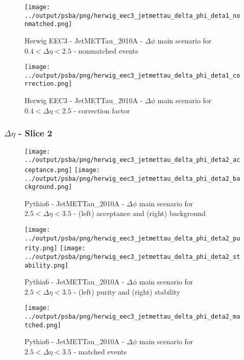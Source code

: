 \documentclass[11pt]{book}
\begin{document}
\begin{figure}[ht]
\centering
\texttt{[image: ../output/psba/png/herwig\_eec3\_jetmettau\_delta\_phi\_deta1\_nonmatched.png]}
\caption{Herwig EEC3 - JetMETTau\_2010A - $\Delta\phi$ main scenario for $0.4 < \Delta\eta < 2.5$ - nonmatched events}
\label{fig:hw_eec3_jetmettau_delta_phi_deta1_nonmatched}
\end{figure}

\begin{figure}[ht]
\centering
\texttt{[image: ../output/psba/png/herwig\_eec3\_jetmettau\_delta\_phi\_deta1\_correction.png]}
\caption{Herwig EEC3 - JetMETTau\_2010A - $\Delta\phi$ main scenario for $0.4 < \Delta\eta < 2.5$ - correction factor}
\label{fig:hw_eec3_jetmettau_delta_phi_deta1_correction}
\end{figure}

\clearpage
\subsubsection{$\Delta\eta$ - Slice 2}

\begin{figure}[ht]
\centering
\texttt{[image: ../output/psba/png/herwig\_eec3\_jetmettau\_delta\_phi\_deta2\_acceptance.png]}
\texttt{[image: ../output/psba/png/herwig\_eec3\_jetmettau\_delta\_phi\_deta2\_background.png]}
\caption{Pythia6 - JetMETTau\_2010A - $\Delta\phi$ main scenario for $2.5 < \Delta\eta < 3.5$ - (left) acceptance and (right) background}
\label{fig:p6_jetmettau_delta_phi_deta2_ab}
\end{figure}

\begin{figure}[ht]
\centering
\texttt{[image: ../output/psba/png/herwig\_eec3\_jetmettau\_delta\_phi\_deta2\_purity.png]}
\texttt{[image: ../output/psba/png/herwig\_eec3\_jetmettau\_delta\_phi\_deta2\_stability.png]}
\caption{Pythia6 - JetMETTau\_2010A - $\Delta\phi$ main scenario for $2.5 < \Delta\eta < 3.5$ - (left) purity and (right) stability}
\label{fig:p6_jetmettau_delta_phi_deta2_ps}
\end{figure}

\begin{figure}[ht]
\centering
\texttt{[image: ../output/psba/png/herwig\_eec3\_jetmettau\_delta\_phi\_deta2\_matched.png]}
\caption{Pythia6 - JetMETTau\_2010A - $\Delta\phi$ main scenario for $2.5 < \Delta\eta < 3.5$ - matched events}
\label{fig:p6_jetmettau_delta_phi_deta2_matched}
\end{figure}
\end{document}
